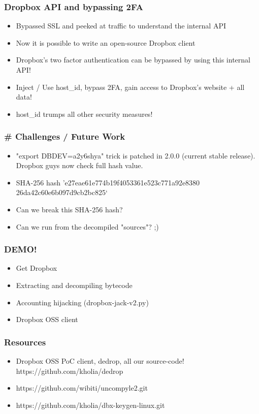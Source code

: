 \documentclass{beamer}
\newcommand\myfont{\fontsize{14}{20}\selectfont}
\begin{document}
\begin{frame}
\frametitle{Dropbox API and bypassing 2FA}
\begin{itemize}
\itemsep 2em
\item Bypassed SSL and peeked at traffic to understand the internal API
\item Now it is possible to write an open-source Dropbox client
\item Dropbox's two factor authentication can be bypassed by using this internal API!
\item Inject / Use host\_id, bypass 2FA, gain access to Dropbox's website + all data!
\item host\_id trumps all other security measures!
\end{itemize}
\end{frame}

\begin{frame}
\frametitle{\# Challenges / Future Work}
\begin{itemize}
\itemsep 2em
\item "export DBDEV=a2y6shya" trick is patched in 2.0.0 (current stable release). Dropbox guys now check full hash value.
\item SHA-256 hash 'e27eae61e774b19f4053361e523c771a92e8380\\26da42c60e6b097d9cb2bc825‘
\item Can we break this SHA-256 hash?
\item Can we run from the decompiled "sources"? ;)
\end{itemize}
\end{frame}

\begin{frame}
\frametitle{DEMO!}
\myfont
\begin{itemize}
\itemsep 2.4em
\item Get Dropbox
\item Extracting and decompiling bytecode
\item Accounting hijacking (dropbox-jack-v2.py)
\item Dropbox OSS client
\end{itemize}
\end{frame}

\begin{frame}
\frametitle{Resources}
\myfont
\begin{itemize}
\itemsep 2em
\item Dropbox OSS PoC client, dedrop, all our source-code! \\
      \vspace{0.9em} https://github.com/kholia/dedrop
\item https://github.com/wibiti/uncompyle2.git
\item https://github.com/kholia/dbx-keygen-linux.git
\end{itemize}
\end{frame}
\end{document}
